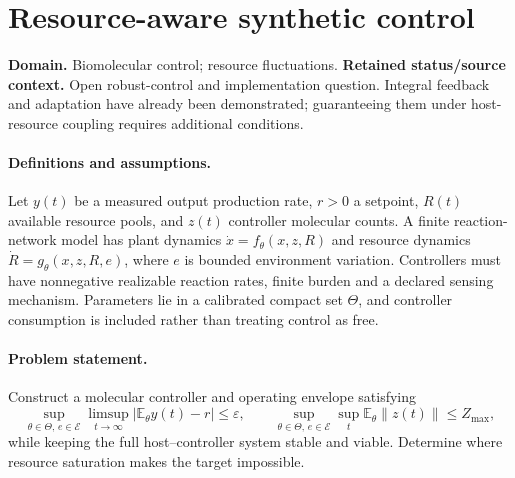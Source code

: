 \documentclass[11pt]{article}
\begin{document}
\section*{Resource-aware synthetic control}
\label{prob:270}
\label{rank:184}
\par\smallskip

\noindent\textbf{Domain.} Biomolecular control; resource fluctuations. \quad \textbf{Retained status/source context.} Open robust-control and implementation question. Integral feedback and adaptation have already been demonstrated; guaranteeing them under host-resource coupling requires additional conditions.

\paragraph{Definitions and assumptions.} Let $y(t)$ be a measured output production rate, $r>0$ a setpoint, $R(t)$ available resource pools, and $z(t)$ controller molecular counts. A finite reaction-network model has plant dynamics $\dot x=f_\theta(x,z,R)$ and resource dynamics $\dot R=g_\theta(x,z,R,e)$, where $e$ is bounded environment variation. Controllers must have nonnegative realizable reaction rates, finite burden and a declared sensing mechanism. Parameters lie in a calibrated compact set $\Theta$, and controller consumption is included rather than treating control as free.

\paragraph{Problem statement.} Construct a molecular controller and operating envelope satisfying
\[
\sup_{\theta\in\Theta,\,e\in\mathcal E}
\limsup_{t\to\infty}|\mathbb{E}_\theta y(t)-r|\leq\varepsilon,
\qquad \sup_{\theta\in\Theta,\,e\in\mathcal E}\sup_t\mathbb{E}_\theta\|z(t)\|\leq Z_{\max},
\]
while keeping the full host--controller system stable and viable. Determine where resource saturation makes the target impossible.
\end{document}
